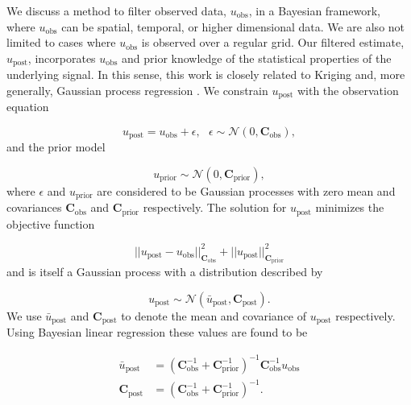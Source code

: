 \documentclass[10pt,a4paper]{article}
\begin{document}
We discuss a method to filter observed data, $u_\mathrm{obs}$, in a Bayesian framework, where $u_\mathrm{obs}$ can be spatial, temporal, or higher dimensional data.  We are also not limited to cases where $u_\mathrm{obs}$ is observed over a regular grid. Our filtered estimate, $u_\mathrm{post}$, incorporates $u_\mathrm{obs}$ and prior knowledge of the statistical properties of the underlying signal.  In this sense, this work is closely related to Kriging and, more generally, Gaussian process regression \citep[e.g][]{Rasmussen2006} .  We constrain $u_\mathrm{post}$ with the observation equation

\begin{equation}\label{eq:Data}
  u_\mathrm{post} = u_\mathrm{obs} + \epsilon,\ \ \ \epsilon \sim \mathcal{N}(0,\mathbf{C}_\mathrm{obs}),
\end{equation}
and the prior model

\begin{equation}\label{eq:Prior}
  u_\mathrm{prior} \sim \mathcal{N}(0,\mathbf{C}_\mathrm{prior}),
\end{equation}
where $\epsilon$ and $u_\mathrm{prior}$ are considered to be Gaussian processes with zero mean and covariances $\mathbf{C}_\mathrm{obs}$ and $\mathbf{C}_\mathrm{prior}$ respectively.  The solution for $u_\mathrm{post}$ minimizes the objective function  

\begin{equation}\label{eq:Objective}
||u_\mathrm{post} - u_\mathrm{obs}||_{\mathbf{C}_\mathrm{obs}}^2 + 
||u_\mathrm{post}||_{\mathbf{C}_\mathrm{prior}}^2
\end{equation}
and is itself a Gaussian process with a distribution described by

\begin{equation}
  u_\mathrm{post} \sim \mathcal{N}(\bar{u}_\mathrm{post},\mathbf{C}_\mathrm{post}).
\end{equation}
We use $\bar{u}_\mathrm{post}$ and $\mathbf{C}_\mathrm{post}$ to denote the mean and covariance of $u_\mathrm{post}$ respectively.  Using Bayesian linear regression \citep[e.g.][]{Tarantola2005} these values are found to be  

\begin{equation}\label{eq:GeneralSolution}
\begin{split}
  \bar{u}_\mathrm{post} &= (\mathbf{C}_\mathrm{obs}^{-1} + 
                            \mathbf{C}_\mathrm{prior}^{-1})^{-1}
                            \mathbf{C}_\mathrm{obs}^{-1} u_\mathrm{obs}
\\
\mathbf{C}_\mathrm{post} &= (\mathbf{C}_\mathrm{obs}^{-1} + 
                             \mathbf{C}_\mathrm{prior}^{-1})^{-1}.                          
\end{split}
\end{equation}
 
\end{document}
